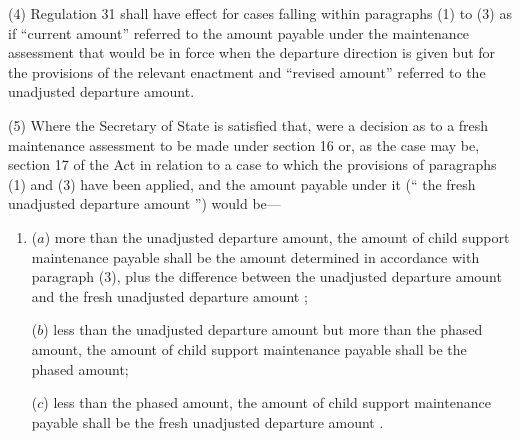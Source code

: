 \documentclass[12pt,a4paper]{article}
\begin{document}
(4) Regulation 31 shall have effect for cases falling within paragraphs (1) to
(3) as if “current amount” referred to the amount payable under the maintenance
assessment that would be in force when the departure direction is given but for
the provisions of the relevant enactment and “revised amount” referred to the
unadjusted departure amount.

(5) 
Where the Secretary of State is satisfied that, were a decision as to a fresh maintenance assessment to be made under section 16 or, as the case may be, section 17 of the Act  %
in relation to a case to which the provisions of 
paragraphs (1) and (3)  %
have been applied, and the amount payable under it (“%
the fresh unadjusted departure amount%
”) would be—
\begin{enumerate}\item[]
($a$) more than the unadjusted departure amount, the amount of child support maintenance payable shall be the amount determined in accordance with paragraph (3), plus the difference between the unadjusted departure amount and 
the fresh unadjusted departure amount%
;

($b$) less than the unadjusted departure amount but more than the phased amount,
the amount of child support maintenance payable shall be the phased amount;

($c$) less than the phased amount, the amount of child support maintenance payable
shall be 
the fresh unadjusted departure amount%
.
\end{enumerate}
\end{document}
